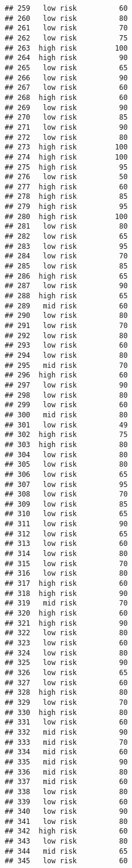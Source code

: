 \documentclass[
  ignorenonframetext,
]{beamer}
\begin{document}
\begin{frame}[fragile]
\begin{verbatim}
## 259   low risk          60
## 260   low risk          80
## 261   low risk          70
## 262   low risk          75
## 263  high risk         100
## 264  high risk          90
## 265   low risk          65
## 266   low risk          90
## 267   low risk          60
## 268  high risk          60
## 269   low risk          90
## 270   low risk          85
## 271   low risk          90
## 272   low risk          80
## 273  high risk         100
## 274  high risk         100
## 275  high risk          95
## 276   low risk          50
## 277  high risk          60
## 278  high risk          85
## 279  high risk          95
## 280  high risk         100
## 281   low risk          80
## 282   low risk          65
## 283   low risk          95
## 284   low risk          70
## 285   low risk          85
## 286  high risk          65
## 287   low risk          90
## 288  high risk          65
## 289   mid risk          60
## 290   low risk          80
## 291   low risk          70
## 292   low risk          80
## 293   low risk          60
## 294   low risk          80
## 295   mid risk          70
## 296  high risk          60
## 297   low risk          90
## 298   low risk          80
## 299   low risk          60
## 300   mid risk          80
## 301   low risk          49
## 302  high risk          75
## 303  high risk          80
## 304   low risk          80
## 305   low risk          80
## 306   low risk          65
## 307   low risk          95
## 308   low risk          70
## 309   low risk          85
## 310   low risk          65
## 311   low risk          90
## 312   low risk          65
## 313   low risk          60
## 314   low risk          80
## 315   low risk          70
## 316   low risk          80
## 317  high risk          60
## 318  high risk          90
## 319   mid risk          70
## 320  high risk          60
## 321  high risk          90
## 322   low risk          80
## 323   low risk          60
## 324   low risk          80
## 325   low risk          90
## 326   low risk          65
## 327   low risk          60
## 328  high risk          80
## 329   low risk          70
## 330  high risk          80
## 331   low risk          60
## 332   mid risk          90
## 333   mid risk          70
## 334   mid risk          60
## 335   mid risk          90
## 336   mid risk          80
## 337   mid risk          60
## 338   low risk          80
## 339   low risk          60
## 340   low risk          90
## 341   low risk          80
## 342  high risk          60
## 343   low risk          80
## 344   mid risk          65
## 345   low risk          60

\end{verbatim}
\end{frame}
\end{document}

